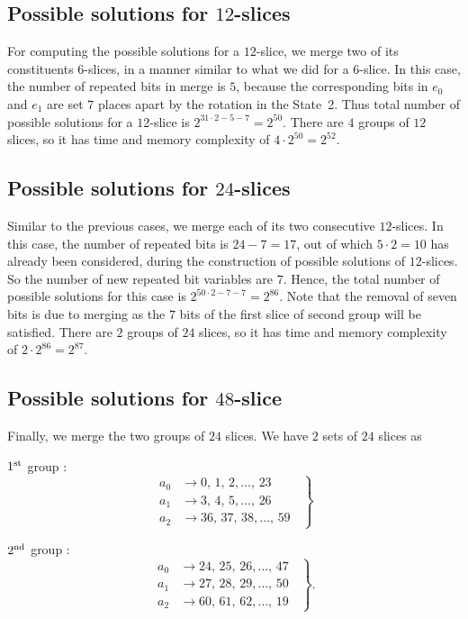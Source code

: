 \subsection{Possible solutions for $12$-slices} 
For computing the possible solutions for a $12$-slice, we merge two of its constituents $6$-slices, in a manner similar to what we did for a $6$-slice. In this case, the number of repeated bits in merge is $5$, because the corresponding bits in $e_0$ and $e_1$ are set $7$ places apart by the rotation in the State~2. Thus total number of possible solutions for a $12$-slice is $2^{31 \cdot 2 - 5 - 7} = 2^{50}$. There are $4$ groups of $12$ slices, so it has time and memory complexity of $4 \cdot 2^{50} = 2^{52}$.

\subsection{Possible solutions for $24$-slices}  
Similar to the previous cases, we merge each of its two consecutive  
$12$-slices. 
In this case, the number of repeated bits is $24-7=17$, out of which $5\cdot 2=10$ has already been considered, during the construction of possible solutions of $12$-slices. So the number of new repeated bit variables are $7$.
Hence, the total number of possible solutions for this case is $2^{50\cdot 2 - 7 - 7} = 2^{86}$. Note that the removal of seven bits is due to merging as the $7$ bits of the first slice of second group will be satisfied. There are $2$ groups of $24$ slices, so it has time and memory complexity of $2 \cdot 2^{86} = 2^{87}$.\\


\subsection{Possible solutions for $48$-slice}
Finally, we merge the two groups of $24$ slices.
We have $2$ sets of $24$ slices as

$1^{\rm st}$ group :
\begin{equation}\label{48_sol_1}
	\left.
	\begin{aligned}
    	a_0 &\rightarrow 0,\, 1,\, 2, \ldots ,\, 23\\
    	a_1 &\rightarrow 3,\,4, \,5, \ldots ,\, 26\\
    	a_2 &\rightarrow 36,\,37,\,38, \ldots ,\, 59
    \end{aligned}
    \;\;\right\}
\end{equation}

$2^{\rm nd}$ group :
\begin{equation}\label{48_sol_2}
	\left.
	\begin{aligned}    
      a_0 & \rightarrow 24,\, 25,\, 26, \ldots , \,47\\
      a_1 & \rightarrow 27,\, 28, \,29, \ldots , \,50\\
      a_2 & \rightarrow 60,\, 61,\,62, \ldots , \,19
    \end{aligned}
	\;\;\right\}.
\end{equation}

